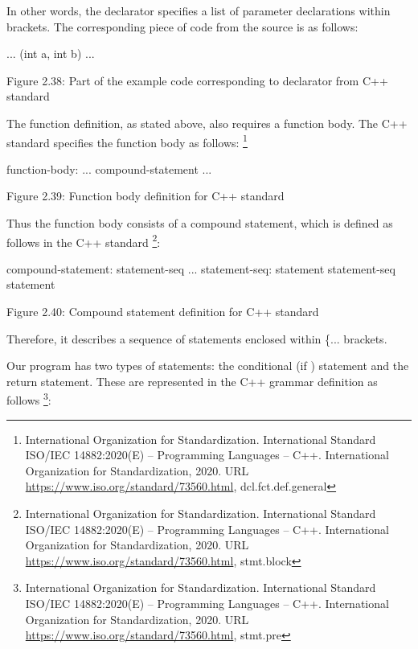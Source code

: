 In other words, the declarator specifies a list of parameter declarations within brackets. The corresponding piece of code from the source is as follows:

\begin{cpp}
... (int a, int b)
...
\end{cpp}

\begin{center}
Figure 2.38: Part of the example code corresponding to declarator from C++ standard
\end{center}

The function definition, as stated above, also requires a function body. The C++ standard specifies the function body as follows: \footnote{International Organization for Standardization. International Standard ISO/IEC 14882:2020(E) – Programming Languages – C++. International Organization for Standardization, 2020. URL \url{https://www.iso.org/standard/73560.html}, dcl.fct.def.general}

\begin{shell}
function-body:
    ... compound-statement
    ...
\end{shell}

\begin{center}
Figure 2.39: Function body definition for C++ standard
\end{center}

Thus the function body consists of a compound statement, which is defined as follows in the C++ standard \footnote{International Organization for Standardization. International Standard ISO/IEC 14882:2020(E) – Programming Languages – C++. International Organization for Standardization, 2020. URL \url{https://www.iso.org/standard/73560.html}, stmt.block}:

\begin{shell}
compound-statement:
    { statement-seq ... }
statement-seq:
    statement
    statement-seq statement
\end{shell}

\begin{center}
Figure 2.40: Compound statement definition for C++ standard
\end{center}

Therefore, it describes a sequence of statements enclosed within \{... brackets.

Our program has two types of statements: the conditional (if ) statement and the return statement. These are represented in the C++ grammar definition as follows \footnote{International Organization for Standardization. International Standard ISO/IEC 14882:2020(E) – Programming Languages – C++. International Organization for Standardization, 2020. URL \url{https://www.iso.org/standard/73560.html}, stmt.pre}:

